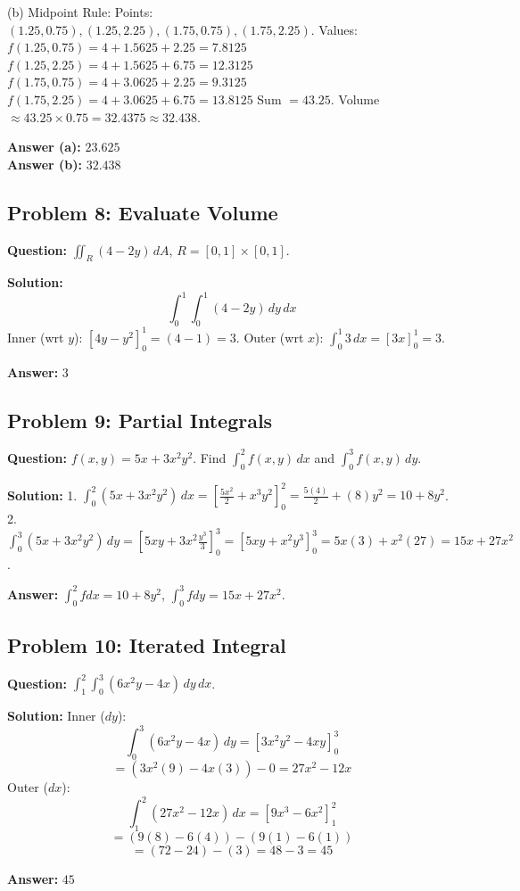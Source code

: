 \documentclass[11pt,a4paper]{article}
\begin{document}
(b) Midpoint Rule:
Points: $(1.25, 0.75), (1.25, 2.25), (1.75, 0.75), (1.75, 2.25)$.
Values:
$f(1.25, 0.75) = 4 + 1.5625 + 2.25 = 7.8125$
$f(1.25, 2.25) = 4 + 1.5625 + 6.75 = 12.3125$
$f(1.75, 0.75) = 4 + 3.0625 + 2.25 = 9.3125$
$f(1.75, 2.25) = 4 + 3.0625 + 6.75 = 13.8125$
Sum $= 43.25$.
Volume $\approx 43.25 \times 0.75 = 32.4375 \approx 32.438$.

\textbf{Answer (a):} $23.625$ \\
\textbf{Answer (b):} $32.438$

\subsection*{Problem 8: Evaluate Volume}
\textbf{Question:} $\iint_R (4-2y) \, dA$, $R=[0,1] \times [0,1]$.

\textbf{Solution:}
\[ \int_0^1 \int_0^1 (4-2y) \, dy \, dx \]
Inner (wrt $y$): $[4y - y^2]_0^1 = (4-1) = 3$.
Outer (wrt $x$): $\int_0^1 3 \, dx = [3x]_0^1 = 3$.

\textbf{Answer:} $3$

\subsection*{Problem 9: Partial Integrals}
\textbf{Question:} $f(x,y) = 5x + 3x^2y^2$. Find $\int_0^2 f(x,y) \, dx$ and $\int_0^3 f(x,y) \, dy$.

\textbf{Solution:}
1. $\int_0^2 (5x + 3x^2y^2) \, dx = [\frac{5x^2}{2} + x^3y^2]_0^2 = \frac{5(4)}{2} + (8)y^2 = 10 + 8y^2$.
2. $\int_0^3 (5x + 3x^2y^2) \, dy = [5xy + 3x^2\frac{y^3}{3}]_0^3 = [5xy + x^2y^3]_0^3 = 5x(3) + x^2(27) = 15x + 27x^2$.

\textbf{Answer:} $\int_0^2 f dx = 10+8y^2$, $\int_0^3 f dy = 15x+27x^2$.

\subsection*{Problem 10: Iterated Integral}
\textbf{Question:} $\int_1^2 \int_0^3 (6x^2y - 4x) \, dy \, dx$.

\textbf{Solution:}
Inner ($dy$):
\[ \int_0^3 (6x^2y - 4x) \, dy = \left[ 3x^2y^2 - 4xy \right]_0^3 \]
\[ = (3x^2(9) - 4x(3)) - 0 = 27x^2 - 12x \]
Outer ($dx$):
\[ \int_1^2 (27x^2 - 12x) \, dx = \left[ 9x^3 - 6x^2 \right]_1^2 \]
\[ = (9(8) - 6(4)) - (9(1) - 6(1)) \]
\[ = (72 - 24) - (3) = 48 - 3 = 45 \]

\textbf{Answer:} $45$
\end{document}
